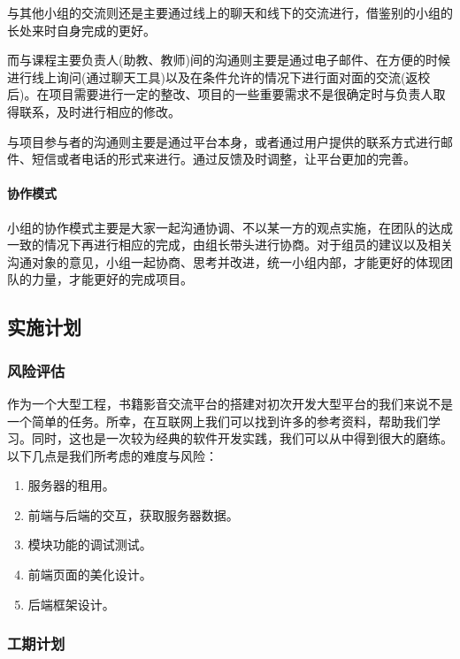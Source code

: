\documentclass[
]{article}
\begin{document}
与其他小组的交流则还是主要通过线上的聊天和线下的交流进行，借鉴别的小组的长处来时自身完成的更好。

而与课程主要负责人(助教、教师)间的沟通则主要是通过电子邮件、在方便的时候进行线上询问(通过聊天工具)以及在条件允许的情况下进行面对面的交流(返校后)。在项目需要进行一定的整改、项目的一些重要需求不是很确定时与负责人取得联系，及时进行相应的修改。

与项目参与者的沟通则主要是通过平台本身，或者通过用户提供的联系方式进行邮件、短信或者电话的形式来进行。通过反馈及时调整，让平台更加的完善。

\hypertarget{header-n3427}{%
\paragraph{协作模式}\label{header-n3427}}

小组的协作模式主要是大家一起沟通协调、不以某一方的观点实施，在团队的达成一致的情况下再进行相应的完成，由组长带头进行协商。对于组员的建议以及相关沟通对象的意见，小组一起协商、思考并改进，统一小组内部，才能更好的体现团队的力量，才能更好的完成项目。

\hypertarget{header-n3429}{%
\subsection{实施计划}\label{header-n3429}}

\hypertarget{header-n3430}{%
\subsubsection{风险评估}\label{header-n3430}}

作为一个大型工程，书籍影音交流平台的搭建对初次开发大型平台的我们来说不是一个简单的任务。所幸，在互联网上我们可以找到许多的参考资料，帮助我们学习。同时，这也是一次较为经典的软件开发实践，我们可以从中得到很大的磨练。\\
以下几点是我们所考虑的难度与风险：

\begin{enumerate}
\def\labelenumi{\arabic{enumi}.}
\item
  服务器的租用。
\item
  前端与后端的交互，获取服务器数据。
\item
  模块功能的调试测试。
\item
  前端页面的美化设计。
\item
  后端框架设计。
\end{enumerate}

\hypertarget{header-n3443}{%
\subsubsection{工期计划}\label{header-n3443}}
\end{document}

